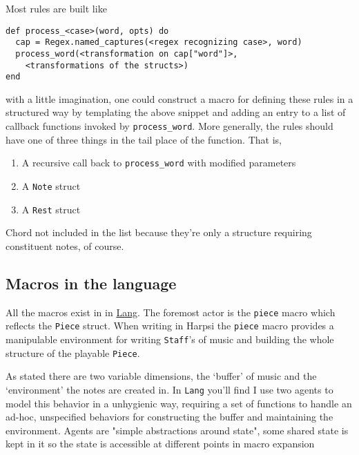 \documentclass[11pt]{article}
\begin{document}
Most rules are built like
\begin{verbatim}
def process_<case>(word, opts) do
  cap = Regex.named_captures(<regex recognizing case>, word)
  process_word(<transformation on cap["word"]>,
    <transformations of the structs>)
end
\end{verbatim}
with a little imagination, one could construct a macro for defining
these rules in a structured way by templating the above snippet and
adding an entry to a list of callback functions invoked by
\texttt{process\_word}. More generally, the rules should have one of three
things in the tail place of the function. That is,
\begin{enumerate}
\item A recursive call back to \texttt{process\_word} with modified parameters
\item A \texttt{Note} struct
\item A \texttt{Rest} struct
\end{enumerate}
Chord not included in the list because they're only a structure
requiring constituent notes, of course.

\subsection{Macros in the language}
\label{sec-3-2}
All the macros exist in in \href{lib/lang.ex}{Lang}. The foremost actor is
the \texttt{piece} macro which reflects the \texttt{Piece} struct. When writing
in Harpsi the \texttt{piece} macro provides a manipulable environment for
writing \texttt{Staff}'s of music and building the whole structure of the
playable \texttt{Piece}.

As stated there are two variable dimensions, the `buffer' of music
and the `environment' the notes are created in. In \texttt{Lang} you'll
find I use two agents to model this behavior in a unhygienic way,
requiring a set of functions to handle an ad-hoc, unspecified
behaviors for constructing the buffer and maintaining the
environment. Agents are "simple abstractions around state", some
shared state is kept in it so the state is accessible at different
points in macro expansion
\end{document}
